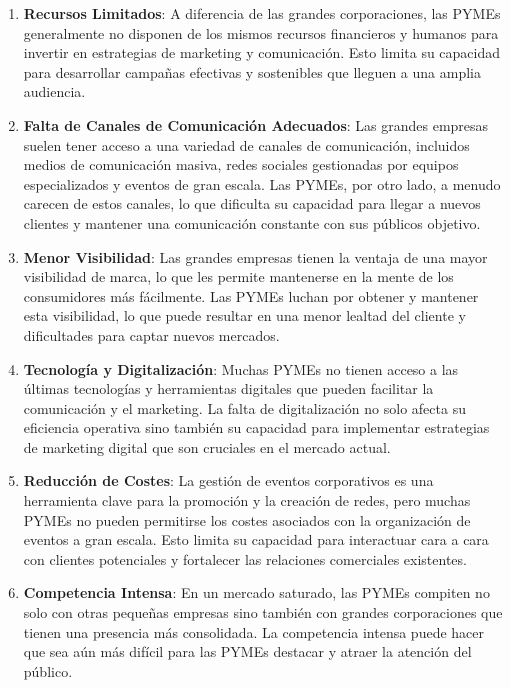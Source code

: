 \begin{enumerate}
    \item \textbf{Recursos Limitados}: A diferencia de las grandes corporaciones, las PYMEs generalmente no disponen de los mismos recursos financieros 
    y humanos para invertir en estrategias de marketing y comunicación. Esto limita su capacidad para desarrollar campañas efectivas y sostenibles que
    lleguen a una amplia audiencia.
    
    \item \textbf{Falta de Canales de Comunicación Adecuados}: Las grandes empresas suelen tener acceso a una variedad de canales de comunicación, 
    incluidos medios de comunicación masiva, redes sociales gestionadas por equipos especializados y eventos de gran escala. 
    Las PYMEs, por otro lado, a menudo carecen de estos canales, lo que dificulta su capacidad para llegar a nuevos clientes y 
    mantener una comunicación constante con sus públicos objetivo.
    
    \item \textbf{Menor Visibilidad}: Las grandes empresas tienen la ventaja de una mayor visibilidad de marca, 
    lo que les permite mantenerse en la mente de los consumidores más fácilmente. Las PYMEs luchan por obtener y mantener esta visibilidad, 
    lo que puede resultar en una menor lealtad del cliente y dificultades para captar nuevos mercados.
    
    \item \textbf{Tecnología y Digitalización}: Muchas PYMEs no tienen acceso a las últimas tecnologías y herramientas digitales que pueden 
    facilitar la comunicación y el marketing. La falta de digitalización no solo afecta su eficiencia operativa sino también su capacidad para 
    implementar estrategias de marketing digital que son cruciales en el mercado actual.
    
    \item \textbf{Reducción de Costes}: La gestión de eventos corporativos es una herramienta clave para la promoción y la creación de redes, 
    pero muchas PYMEs no pueden permitirse los costes asociados con la organización de eventos a gran escala. Esto limita su capacidad para interactuar cara a cara con clientes potenciales y fortalecer las relaciones comerciales existentes.
    
    \item \textbf{Competencia Intensa}: En un mercado saturado, las PYMEs compiten no solo con otras pequeñas empresas sino también con grandes 
    corporaciones que tienen una presencia más consolidada. La competencia intensa puede hacer que sea aún más difícil para las PYMEs destacar y 
    atraer la atención del público.
\end{enumerate}



